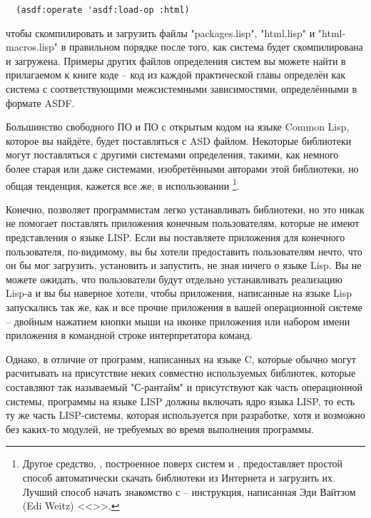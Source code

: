 \begin{lstlisting}
  (asdf:operate 'asdf:load-op :html)
\end{lstlisting}

чтобы скомпилировать и загрузить файлы "packages.lisp", "html.lisp" и "html-macros.lisp" в
правильном порядке после того, как система  будет скомпилирована и
загружена. Примеры других файлов определения систем  вы можете найти в
прилагаемом к книге коде -- код из каждой практической главы определён как система с
соответствующими межсистемными зависимостями, определёнными в формате ASDF.

Большинство свободного ПО и ПО с открытым кодом на языке Common Lisp, которое вы найдёте,
будет поставляться с ASD файлом. Некоторые библиотеки могут поставляться с другими
системами определения, такими, как немного более старая  или даже
системами, изобретёнными авторами этой библиотеки, но общая тенденция, кажется все же, в
использовании \footnote{Другое средство, , построенное
  поверх систем  и , предоставляет простой способ
  автоматически скачать библиотеки из Интернета и загрузить их. Лучший способ начать
  знакомство с  -- инструкция, написанная Эди Вайтзом (Edi Weitz)
  <<>>. }.

Конечно,  позволяет программистам легко устанавливать библиотеки, но это никак
не помогает поставлять приложения конечным пользователям, которые не имеют представления о
языке LISP. Если вы поставляете приложения для конечного пользователя, по-видимому, вы бы
хотели предоставить пользователям нечто, что он бы мог загрузить, установить и запустить,
не зная ничего о языке Lisp. Вы не можете ожидать, что пользователи будут отдельно
устанавливать реализацию Lisp-а и вы бы наверное хотели, чтобы приложения, написанные на
языке Lisp запускались так же, как и все прочие приложения в вашей операционной системе --
двойным нажатием кнопки мыши на иконке приложения или набором имени приложения в командной
строке интерпретатора команд.

Однако, в отличие от программ, написанных на языке C, которые обычно могут расчитывать на
присутствие неких совместно используемых библиотек, которые составляют так называемый
"С-рантайм" и присутствуют как часть операционной системы, программы на языке LISP должны
включать ядро языка LISP, то есть ту же часть LISP-системы, которая используется при
разработке, хотя и возможно без каких-то модулей, не требуемых во время выполнения
программы.

